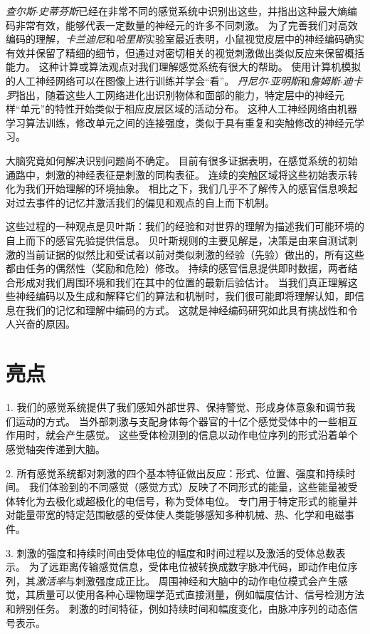 \textit{查尔斯$\cdot$史蒂芬斯}已经在非常不同的感觉系统中识别出这些，并指出这种最大熵编码非常有效，能够代表一定数量的神经元的许多不同刺激。
为了完善我们对高效编码的理解，\textit{卡兰迪尼}和\textit{哈里斯}实验室最近表明，小鼠视觉皮层中的神经编码确实有效并保留了精细的细节，但通过对密切相关的视觉刺激做出类似反应来保留概括能力。
这种计算或算法观点对我们理解感觉系统有很大的帮助。
使用计算机模拟的人工神经网络可以在图像上进行训练并学会“看”。
\textit{丹尼尔$\cdot$亚明斯}和\textit{詹姆斯$\cdot$迪卡罗}指出，随着这些人工网络进化出识别物体和面部的能力，特定层中的神经元样“单元”的特性开始类似于相应皮层区域的活动分布。
这种人工神经网络由机器学习算法训练，修改单元之间的连接强度，类似于具有重复和突触修改的神经元学习。


大脑究竟如何解决识别问题尚不确定。
目前有很多证据表明，在感觉系统的初始通路中，刺激的神经表征是刺激的同构表征。
连续的突触区域将这些初始表示转化为我们开始理解的环境抽象。
相比之下，我们几乎不了解传入的感官信息唤起对过去事件的记忆并激活我们的偏见和观点的自上而下机制。


这些过程的一种观点是贝叶斯：我们的经验和对世界的理解为描述我们可能环境的自上而下的感官先验提供信息。
贝叶斯规则的主要见解是，决策是由来自测试刺激的当前证据的似然比和受试者以前对类似刺激的经验（先验）做出的，所有这些都由任务的偶然性（奖励和危险）修改。
持续的感官信息提供即时数据，两者结合形成对我们周围环境和我们在其中的位置的最新后验估计。
当我们真正理解这些神经编码以及生成和解释它们的算法和机制时，我们很可能即将理解认知，即信息在我们的记忆和理解中编码的方式。
这就是神经编码研究如此具有挑战性和令人兴奋的原因。



\section{亮点}

1. 我们的感觉系统提供了我们感知外部世界、保持警觉、形成身体意象和调节我们运动的方式。
当外部刺激与支配身体每个器官的十亿个感觉受体中的一些相互作用时，就会产生感觉。 
这些受体检测到的信息以动作电位序列的形式沿着单个感觉轴突传递到大脑。

2. 所有感觉系统都对刺激的四个基本特征做出反应：形式、位置、强度和持续时间。
我们体验到的不同感觉（感觉方式）反映了不同形式的能量，这些能量被受体转化为去极化或超极化的电信号，称为受体电位。
专门用于特定形式的能量并对能量带宽的特定范围敏感的受体使人类能够感知多种机械、热、化学和电磁事件。


3. 刺激的强度和持续时间由受体电位的幅度和时间过程以及激活的受体总数表示。
为了远距离传输感觉信息，受体电位被转换成数字脉冲代码，即动作电位序列，其\textit{激活率}与刺激强度成正比。
周围神经和大脑中的动作电位模式会产生感觉，其质量可以使用各种心理物理学范式直接测量，例如幅度估计、信号检测方法和辨别任务。
刺激的时间特征，例如持续时间和幅度变化，由脉冲序列的动态信号表示。

